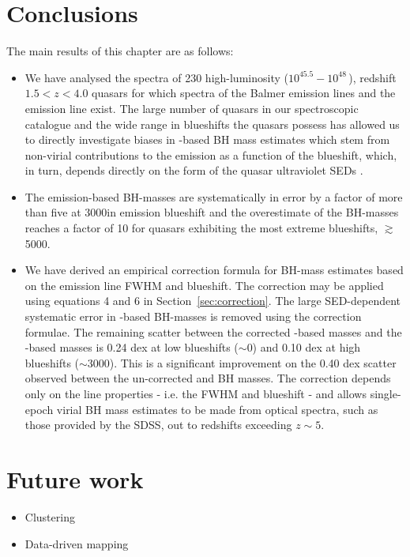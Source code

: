 \section{Conclusions}
\label{sec:conclusions}

The main results of this chapter are as follows: 

\begin{itemize}
\item We have analysed the spectra of 230 high-luminosity ($10^{45.5}-10^{48}$\,\ergs), redshift $1.5 < z < 4.0$ quasars for which spectra of the Balmer emission lines and the  emission line exist.
The large number of quasars in our spectroscopic catalogue and the wide range in  blueshifts the quasars possess has allowed us to directly investigate biases in -based BH mass estimates which stem from non-virial contributions to the  emission as a function of the  blueshift, which, in turn, depends directly on the form of the quasar ultraviolet SEDs \citep{richards11}.
\item The  emission-based BH-masses are systematically in error by a factor of more than five at 3000\kms in  emission blueshift and the overestimate of the BH-masses reaches a factor of 10 for quasars exhibiting the most extreme blueshifts, $\gtrsim$5000\kms. 
\item We have derived an empirical correction formula for BH-mass estimates based on the  emission line FWHM and blueshift.
The correction may be applied using equations 4 and 6 in Section~\ref{sec:correction}.
The large SED-dependent systematic error in -based BH-masses is removed using the correction formulae.
The remaining scatter between the corrected -based masses and the \hans-based masses is 0.24 dex at low  blueshifts ($\sim$0\kms) and 0.10 dex at high blueshifts ($\sim$3000\kms). 
This is a significant improvement on the 0.40 dex scatter observed between the un-corrected  and \ha BH masses. 
The correction depends only on the  line properties - i.e. the FWHM and blueshift - and allows single-epoch virial BH mass estimates to be made from optical spectra, such as those provided by the SDSS, out to redshifts exceeding $z\sim 5$. 
\end{itemize}

\section{Future work}

\begin{itemize}
\item Clustering
\item Data-driven mapping
\end{itemize}
